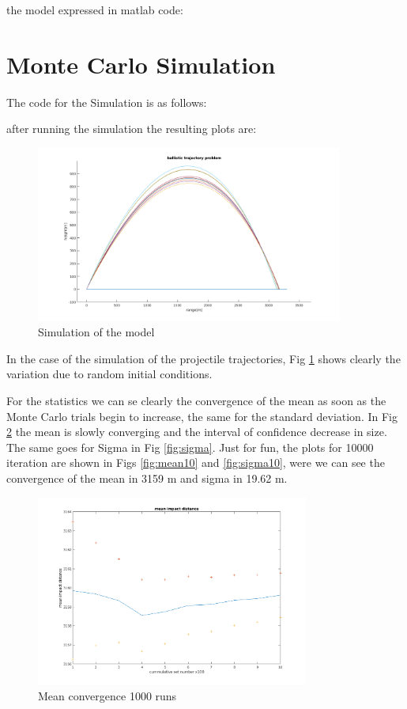 \documentclass[12pt,letterpaper]{article}
\begin{document}
the model expressed in matlab code:


\section{Monte Carlo Simulation}
The code for the Simulation is as follows:

after running the simulation the resulting plots are:

\begin{figure}[!h] 
    \centering
    \includegraphics[width=0.9\textwidth]{../matlab/img/simu.png}
    \caption{Simulation of the model}
    \label{fig:simu}
    \end{figure}
    
    In the case of the simulation of the projectile trajectories, Fig \ref{fig:simu} shows clearly the variation due to random
    initial conditions.
    
    For the statistics we can se clearly the convergence of the mean as soon as the Monte Carlo trials begin to 
    increase, the same for the standard deviation. In Fig \ref{fig:mean} the mean is slowly converging and the interval of confidence
    decrease in size. The same goes for Sigma in Fig \ref{fig:sigma}. Just for fun, the plots for 10000 iteration are shown in Figs \ref{fig:mean10}
    and \ref{fig:sigma10}, were we can see the convergence of the mean in 3159 m and sigma in 19.62 m.
    \begin{figure}[!h] 
        \centering
        \includegraphics[width=0.8\textwidth]{../matlab/img/mean.png}
        \caption{Mean convergence 1000 runs}
        \label{fig:mean}
    \end{figure}
    
\end{document}
